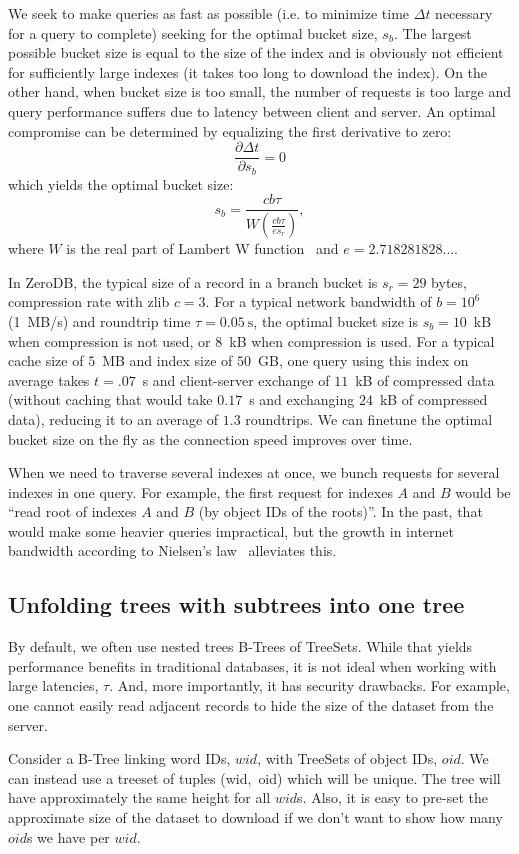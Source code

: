 \documentclass[notitlepage]{revtex4-1}
\begin{document}
We seek to make queries as fast as possible (i.e. to minimize time $\Delta t$ necessary for a query to complete) seeking for the optimal bucket size, $s_b$.
The largest possible bucket size is equal to the size of the index and is obviously not efficient for sufficiently large indexes (it takes too long to download the index).
On the other hand, when bucket size is too small, the number of requests is too large and query performance suffers due to latency between client and server.
An optimal compromise can be determined by equalizing the first derivative to zero:
$$\frac{\partial \Delta t}{\partial s_b} = 0$$
which yields the optimal bucket size:
$$s_b = \frac{cb\tau}{W\left( \frac{cb\tau}{e s_r}\right)},$$
where $W$ is the real part of Lambert W function~\cite{wiki:lambert}
and $e=2.718281828\ldots$.

In ZeroDB, the typical size of a record in a branch bucket is $s_r = 29$ bytes,
compression rate with zlib $c=3$.
For a typical network bandwidth of $b=10^6$ (1~MB/s) and roundtrip time $\tau=0.05~\mbox{s}$, the optimal bucket size is $s_b=10$~kB when compression is not used, or $8$~kB when compression is used.
For a typical cache size of $5$~MB and index size of $50$~GB,
one query using this index on average takes $t=.07$~s and client-server exchange of $11$~kB of compressed data (without caching that would take $0.17$~s and exchanging $24$~kB of compressed data), reducing it to an average of $1.3$ roundtrips.
We can finetune the optimal bucket size on the fly as the connection speed improves over time.

When we need to traverse several indexes at once, we bunch requests for several indexes in one query.
For example, the first request for indexes $A$ and $B$ would be ``read root of indexes $A$ and $B$ (by object IDs of the roots)''.
In the past, that would make some heavier queries impractical, but the growth in internet bandwidth according to Nielsen's law~\cite{nielsen-law} alleviates this.

\subsection{Unfolding trees with subtrees into one tree}
\label{sec:unfold-trees}

By default, we often use nested trees B-Trees of TreeSets.
While that yields performance benefits in traditional databases, it is not ideal when working with large latencies, $\tau$.
And, more importantly, it has security drawbacks.
For example, one cannot easily read adjacent records to hide the size of the dataset from the server.

Consider a B-Tree linking word IDs, $wid$, with TreeSets of object IDs, $oid$.
We can instead use a treeset of tuples (wid,~oid) which will be unique.
The tree will have approximately the same height for all $wid$s.
Also, it is easy to pre-set the approximate size of the dataset to download if we don't want to show how many $oid$s we have per $wid$.


\end{document}
